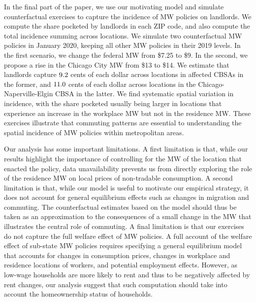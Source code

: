 In the final part of the paper, we use our motivating model and simulate 
counterfactual exercises to capture the incidence of MW policies on landlords.
We compute the share pocketed by landlords in each ZIP code, and also
compute the total incidence summing across locations.
We simulate two counterfactual MW policies in January 2020, keeping all other
MW policies in their 2019 levels.
In the first scenario, we change the federal MW from \$7.25 to \$9.
In the second, we propose a rise in the Chicago City MW from \$13 to \$14.
We estimate that landlords capture $\textnormal{9.2}$ cents of each 
dollar across locations in affected CBSAs in the former, and 
$\textnormal{11.0}$ cents of each dollar across locations in the 
Chicago-Naperville-Elgin CBSA in the latter.
We find systematic spatial variation in incidence,
with the share pocketed usually being larger in locations that experience an
increase in the workplace MW but not in the residence MW.
These exercises illustrate that commuting patterns are essential to 
understanding the spatial incidence of MW policies within metropolitan areas.


Our analysis has some important limitations.
A first limitation is that, while our results highlight the importance of 
controlling for the MW of the location that enacted the policy, data 
unavailability prevents us from directly exploring the role of the residence MW
on local prices of non-tradable consumption.
A second limitation is that, while our model is useful to motivate our 
empirical strategy, it does not account for general equilibrium effects such 
as changes in migration and commuting.
The counterfactual estimates based on the model should thus be taken as an 
approximation to the consequences of a small change in the MW that illustrates
the central role of commuting.
A final limitation is that our exercises do not capture the full welfare 
effect of MW policies.
A full account of the welfare effect of sub-state MW policies requires 
specifying a general equilibrium model that accounts for changes in 
consumption prices, changes in workplace and residence locations of workers, 
and potential employment effects.
However, as low-wage households are more likely to rent and thus to be 
negatively affected by rent changes, our analysis suggest that such computation 
should take into account the homeownership status of households.


